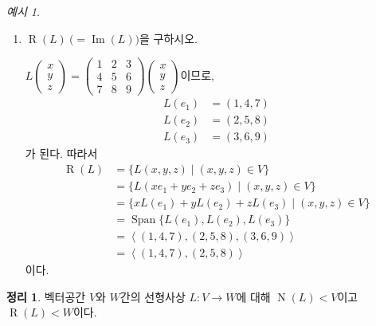 \documentclass[unfonts,oneside,a4paper]{oblivoir}
\theoremstyle{definition}
\theoremstyle{theorem}
\newtheorem{theorem}[definition]{정리}
\theoremstyle{theorem}
\theoremstyle{remark}
\theoremstyle{remark}
\theoremstyle{remark}
\newtheorem*{example}{예시}
\theoremstyle{remark}
\renewcommand{\vec}[1]{\bm{\mathit{#1}}}
\DeclareMathOperator{\Span}{Span}
\DeclareMathOperator{\Null}{N}
\DeclareMathOperator{\Image}{Im}
\DeclareMathOperator{\Range}{R}
\begin{document}
\begin{example}
\begin{enumerate}
    \item $\Range (L)\ \bigl(= \Image(L)\bigr)$을 구하시오.
        \begin{solution}
            $L \begin{pmatrix}
                x \\ y \\ z
                \end{pmatrix} = \begin{pmatrix}
                1 & 2 & 3 \\ 4 & 5 & 6 \\ 7 & 8 & 9
                \end{pmatrix} \begin{pmatrix}
                x \\ y \\ z
            \end{pmatrix}$이므로,
            \begin{align*}
                L(\vec e_1) &= (1, 4, 7)\\
                L(\vec e_2) &= (2, 5, 8)\\
                L(\vec e_3) &= (3, 6, 9)
            \end{align*}
            가 된다.
            따라서
            \begin{align*}
                \Range (L) &= \{L(x, y, z) \mid (x, y, z) \in V\}\\
                           &= \{L(x \vec e_1 + y \vec e_2 + z \vec e_3) \mid (x, y, z) \in V\}\\
                           &= \{x L(\vec e_1) + y L(\vec e_2) + z L(\vec e_3) \mid (x, y, z) \in V\}\\
                           &= \Span \{L(\vec e_1), L(\vec e_2), L(\vec e_3)\}\\
                           &= \left<(1, 4, 7), (2, 5, 8), (3, 6, 9)\right>\\
                           &= \left<(1, 4, 7), (2, 5, 8)\right>
            \end{align*}
            이다.
        \end{solution}
\end{enumerate}
\end{example}

\begin{theorem} \label{thm:nullspace_range}
    벡터공간 $V$와 $W$간의 선형사상 $L: V \rightarrow W$에 대해 $\Null (L) < V$이고 $\Range (L) < W$이다.
\end{theorem}
\end{document}
